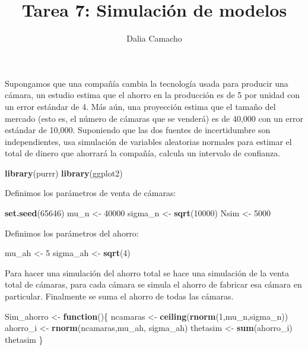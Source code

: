 \documentclass[]{article}
\title{Tarea 7: Simulación de modelos}
\author{Dalia Camacho}
\date{}
\newenvironment{Shaded}{\begin{snugshade}}{\end{snugshade}}
\newcommand{\KeywordTok}[1]{\textcolor[rgb]{0.13,0.29,0.53}{\textbf{#1}}}
\newcommand{\DecValTok}[1]{\textcolor[rgb]{0.00,0.00,0.81}{#1}}
\newcommand{\StringTok}[1]{\textcolor[rgb]{0.31,0.60,0.02}{#1}}
\newcommand{\ControlFlowTok}[1]{\textcolor[rgb]{0.13,0.29,0.53}{\textbf{#1}}}
\newcommand{\NormalTok}[1]{#1}
\begin{document}
\maketitle

Supongamos que una compañía cambia la tecnología usada para producir una
cámara, un estudio estima que el ahorro en la producción es de 5 por
unidad con un error estándar de 4. Más aún, una proyección estima que el
tamaño del mercado (esto es, el número de cámaras que se venderá) es de
40,000 con un error estándar de 10,000. Suponiendo que las dos fuentes
de incertidumbre son independientes, usa simulación de variables
aleatorias normales para estimar el total de dinero que ahorrará la
compañía, calcula un intervalo de confianza.

\begin{Shaded}
\begin{Highlighting}[]
\KeywordTok{library}\NormalTok{(purrr)}
\KeywordTok{library}\NormalTok{(ggplot2)}
\end{Highlighting}
\end{Shaded}

Definimos los parámetros de venta de cámaras:

\begin{Shaded}
\begin{Highlighting}[]
\KeywordTok{set.seed}\NormalTok{(}\DecValTok{65646}\NormalTok{)}
\NormalTok{mu_n    <-}\StringTok{ }\DecValTok{40000}
\NormalTok{sigma_n <-}\StringTok{ }\KeywordTok{sqrt}\NormalTok{(}\DecValTok{10000}\NormalTok{)}
\NormalTok{Nsim    <-}\StringTok{ }\DecValTok{5000}
\end{Highlighting}
\end{Shaded}

Definimos los parámetros del ahorro:

\begin{Shaded}
\begin{Highlighting}[]
\NormalTok{mu_ah    <-}\StringTok{ }\DecValTok{5}
\NormalTok{sigma_ah <-}\StringTok{ }\KeywordTok{sqrt}\NormalTok{(}\DecValTok{4}\NormalTok{)}
\end{Highlighting}
\end{Shaded}

Para hacer una simulación del ahorro total se hace una simulación de la
venta total de cámaras, para cada cámara se simula el ahorro de fabricar
esa cámara en particular. Finalmente se suma el ahorro de todas las
cámaras.

\begin{Shaded}
\begin{Highlighting}[]
\NormalTok{Sim_ahorro <-}\StringTok{ }\ControlFlowTok{function}\NormalTok{()\{}
\NormalTok{  ncamaras <-}\StringTok{ }\KeywordTok{ceiling}\NormalTok{(}\KeywordTok{rnorm}\NormalTok{(}\DecValTok{1}\NormalTok{,mu_n,sigma_n))}
\NormalTok{  ahorro_i <-}\StringTok{ }\KeywordTok{rnorm}\NormalTok{(ncamaras,mu_ah, sigma_ah)}
\NormalTok{  thetasim <-}\StringTok{ }\KeywordTok{sum}\NormalTok{(ahorro_i)}
\NormalTok{  thetasim}
\NormalTok{\}}
\end{Highlighting}
\end{Shaded}
\end{document}
